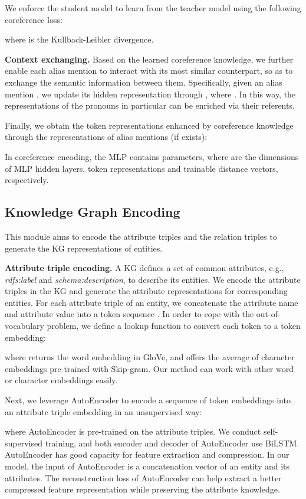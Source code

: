 \documentclass[runningheads]{llncs}
\begin{document}
We enforce the student model to learn from the teacher model using the following coreference loss:

where  is the Kullback-Leibler divergence.

\textbf{Context exchanging.}
Based on the learned coreference knowledge, we further enable each alias mention to interact with its most similar counterpart, so as to exchange the semantic information between them.
Specifically, given an alias mention , we update its hidden representation through ,
where  . 
In this way, the representations of the pronouns in particular can be enriched via their referents.

Finally, we obtain the token representations enhanced by coreference knowledge through the representations of alias mentions (if exists): 


In coreference encoding, the MLP contains  parameters, where  are the dimensions of MLP hidden layers, token representations and trainable distance vectors, respectively.

\subsection{Knowledge Graph Encoding}
This module aims to encode the attribute triples and the relation triples to generate the KG representations of entities.

\textbf{Attribute triple encoding.}
A KG defines a set of common attributes, e.g., \textit{rdfs:label} and \textit{schema:description}, to describe its entities.
We encode the attribute triples in the KG and generate the attribute representations for corresponding entities.
For each attribute triple of an entity, we concatenate the attribute name  and attribute value  into a token sequence  . 
In order to cope with the out-of-vocabulary problem, we define a lookup function to convert each token to a token embedding:

where  returns the word embedding in GloVe, and  offers the average of character embeddings pre-trained with Skip-gram.
Our method can work with other word or character embeddings easily. 

Next, we leverage AutoEncoder to encode a sequence of token embeddings into an attribute triple embedding in an unsupervised way:

where AutoEncoder is pre-trained on the attribute triples. 
We conduct self-supervised training, and both encoder and decoder of AutoEncoder use BiLSTM. 
AutoEncoder has good capacity for feature extraction and compression. In our model, the input of AutoEncoder is a concatenation vector of an entity and its attributes. The reconstruction loss of AutoEncoder can help extract a better compressed feature representation while preserving the attribute knowledge.
\end{document}
